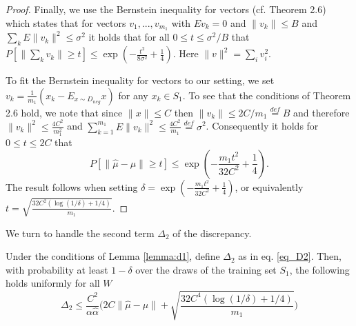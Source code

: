 \documentclass[twoside,11pt]{article}
\begin{document}
\begin{proof}
Finally, we use the Bernstein inequality for vectors (cf. \cite{Candes11} Theorem 2.6) which states that for vectors $v_1,...,v_{m_1}$ with $E v_k = 0$ and $\|v_k\| \le B$ and $\sum_k E \|v_k\|^2 \le \sigma^2$ it holds that for all $0 \le t \le \sigma^2/B$ that $P[\|\sum_k v_k \| \ge t] \le \exp(-\frac{t^2}{8\sigma^2} + \frac{1}{4})$. Here $\|v\|^2 = \sum_i v_i^2$.

To fit the Bernstein inequality for vectors to our setting, we set $v_k = \frac{1}{m_1} (x_k - E_{x \sim D_{neg}} x)$ for any $x_k \in S_1$.  To see that the conditions of \cite{Candes11} Theorem 2.6 hold, we note that since $\|x\| \le C$ then $\|v_k\| \le 2C/m_1 \stackrel{def}{=} B$ and therefore $\|v_k\|^2 \le \frac{4C^2}{m_1^2}$ and  $\sum_{k=1}^{m_1} E \|v_k\|^2 \le \frac{4C^2}{m_1} \stackrel{def}{=} \sigma^2$. Consequently it holds for $0 \le t \le 2C$ that
 \[
 P[\|\hat \mu -\mu\| \ge t] \le \exp \left(- \frac{m_1 t^2}{32 C^2} + \frac{1}{4} \right).
 \]
  The result follows when setting $\delta = \exp(- \frac{m_1 t^2}{32 C^2} + \frac{1}{4})$, or equivalently $t = \sqrt{\frac{32 C^2(\log(1/\delta) + 1/4)}{m_1}}$.
\end{proof}

We turn to handle the second term $\Delta_2$ of the discrepancy.
\begin{lemma}
\label{lemma:d2}
Under the conditions of Lemma \ref{lemma:d1}, define $\Delta_2$ as in eq. \ref{eq_D2}. %
Then, with probability at least $1-\delta$ over the draws of the training set $S_1$, the following holds uniformly for all $W$
$$\Delta_2 \le \frac{C^2}{\alpha \hat \alpha} \Big(2C \|\hat \mu - \mu\| + \sqrt{\frac{32C^4(\log (1/\delta) + 1/4)}{m_1}} \Big)$$
\end{lemma}
\end{document}
